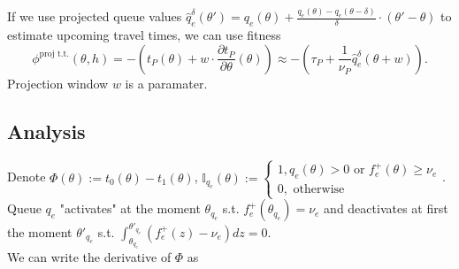 \documentclass[12pt]{article}
\begin{document}
If we use projected queue values $\hat{q}^{\delta}_e(\theta') = q_e(\theta) + \frac{q_e(\theta) - q_e(\theta - \delta)}{\delta} \cdot (\theta' - \theta)$ to estimate upcoming travel times, we can use fitness $$ \phi^{\text{proj t.t.}}(\theta, h) = -(t_P(\theta) + w \cdot \frac{\partial t_P}{\partial \theta}(\theta)) \approx - ( \tau_P + \frac{1}{\nu_P} \hat{q}^{\delta}_e(\theta + w) ). $$  Projection window $w$ is a paramater. 

\subsection*{Analysis}
Denote  $\Phi(\theta) := t_0(\theta) - t_1(\theta)$,  $\mathbb{I}_{q_e}(\theta) := \begin{cases} 1, q_e(\theta) > 0 \text{ or } f_e^+(\theta) \geq \nu_e \\ 0, \text{ otherwise}\end{cases}$.
\\
Queue $q_e$ "activates" at the moment $ \theta_{q_e} $ s.t. $f_e^+( \theta_{q_e}) = \nu_e $ and deactivates at first the moment $\theta'_{q_e}$ s.t. $\int_{\theta_{q_e}}^{ \theta'_{q_e}} (f_e^+(z) - \nu_e)  dz  = 0$.
\\
We can write the derivative of $\Phi$ as
\end{document}
